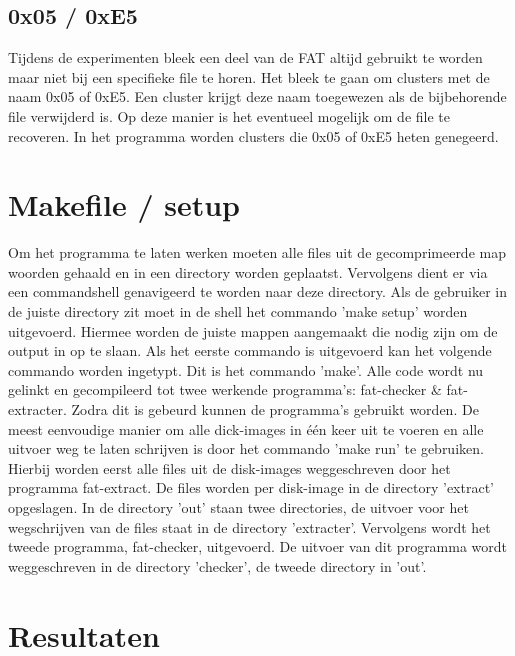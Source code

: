 \documentclass[11pt]{article}
\begin{document}
	\subsection{0x05 / 0xE5}\label{sec:0xE5}
	Tijdens de experimenten bleek een deel van de FAT altijd gebruikt te worden maar niet bij een specifieke file te horen. Het bleek te gaan om clusters met de naam 0x05 of 0xE5. Een cluster krijgt deze naam toegewezen als de bijbehorende file verwijderd is. Op deze manier is het eventueel mogelijk om de file te recoveren. In het programma worden clusters die 0x05 of 0xE5 heten genegeerd. 

	\newpage

	\section{Makefile / setup}\label{sec:setup}
	Om het programma te laten werken moeten alle files uit de gecomprimeerde map woorden gehaald en in een directory worden geplaatst. Vervolgens dient er via een commandshell genavigeerd te worden naar deze directory. Als de gebruiker in de juiste directory zit moet in de shell het commando 'make setup' worden uitgevoerd. 
Hiermee worden de juiste mappen aangemaakt die nodig zijn om de output in op te slaan. Als het eerste commando is uitgevoerd kan het volgende commando worden ingetypt. Dit is het commando 'make'. Alle code wordt nu gelinkt en gecompileerd tot twee werkende programma's: fat-checker \& fat-extracter. Zodra dit is gebeurd kunnen de programma's gebruikt worden. De meest eenvoudige manier om alle dick-images in \'e\'en keer uit te voeren en alle uitvoer weg te laten schrijven is door het commando 'make run' te gebruiken. Hierbij worden eerst alle files uit de disk-images weggeschreven door het programma fat-extract. De files worden per disk-image in de directory 'extract' opgeslagen. In de directory 'out' staan twee directories, de uitvoer voor het wegschrijven van de files staat in de directory 'extracter'.
Vervolgens wordt het tweede programma, fat-checker, uitgevoerd. De uitvoer van dit programma wordt weggeschreven in de directory 'checker', de tweede directory in 'out'.
	
	\newpage

	\section{Resultaten}\label{sec:result}
	
\end{document}
